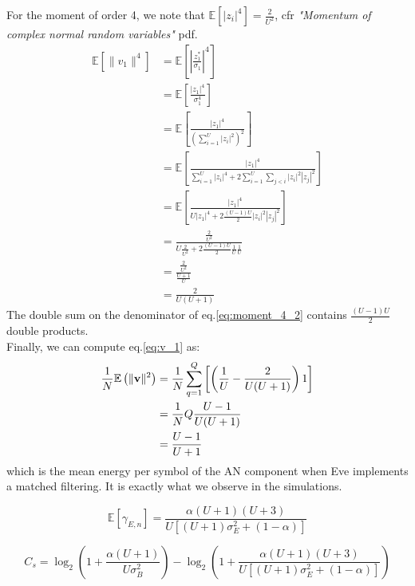 \documentclass[12pt]{article}
\begin{document}
For the moment of order 4, we note that $\mathbb{E}\left[ \left| z_i \right|^4\right] = \frac{2}{U^2}$, cfr \textit{"Momentum of complex normal  random variables"} pdf.
\begin{align}
\mathbb{E} \left[ \| v_1\|^4 \right] &= \mathbb{E}\left[ \left| \frac{z_1^*}{\sigma_1}\right|^4\right] \\
& =  \mathbb{E} \left[ \frac{\left| z_1 \right|^4 }{\sigma_1^4} \right] \\
&=  \mathbb{E} \left[   \frac{\left| z_1 \right|^4 }{  \left( \sum_{i=1}^{U} \left| z_i\right|^2 \right)^2 }  \right] \label{eq:moment_4_1} \\
&= \mathbb{E} \left[   \frac{\left| z_1 \right|^4 }{  \sum_{i=1}^{U} \left| z_i\right|^4 + 2 \sum_{i=1}^{U} \sum_{j<i} \left|z_i\right|^2 \left|z_j\right|^2 }  \right] \label{eq:moment_4_2}\\
&= \mathbb{E} \left[   \frac{\left| z_1 \right|^4 }{ U \left| z_1\right|^4 + 2 \frac{(U-1)U}{2} \left|z_i\right|^2 \left|z_j\right|^2 }  \right] \\
& = \frac{\frac{2}{U^2}}{U\frac{2}{U^2} + 2 \frac{(U-1)U}{2} \frac{1}{U} \frac{1}{U}} \\
& =  \frac{\frac{2}{U^2}}{\frac{U+1}{U}} \\
&= \frac{2}{U(U+1)}
\end{align}
The double sum on the denominator of eq.\ref{eq:moment_4_2} contains $\frac{(U-1)U}{2}$ double products.\\

Finally, we can compute eq.\ref{eq:v_1} as:
\begin{align}
\frac{1}{N}\mathbb{E}\left(\|\boldsymbol{\mathrm{v}}\|^2\right)&=\frac{1}{N} \sum_{q=1}^{Q} \left[ \left( \frac{1}{U} - \frac{2}{U(U+1)} \right) 1\right] \\
&= \frac{1}{N} Q \frac{U-1}{U(U+1)} \\
&= \frac{U-1}{U+1}
\end{align}
which is the mean energy per symbol of the AN component when Eve implements a matched filtering. It is exactly what we observe in the simulations.

\begin{equation}
	\mathbb{E} \left[  \gamma_{E,n}  \right] = \frac{\alpha(U+1)(U+3)}{U\left[ (U+1)\sigma^2_E + (1-\alpha)\right]}
\end{equation}


\begin{equation}
C_s = \log_2\left( 1 + \frac{\alpha (U+1)}{U \sigma^2_B}\right) - \log_2\left(1+\frac{\alpha(U+1)(U+3)}{U\left[ (U+1)\sigma^2_E + (1-\alpha)\right]}\right)
\end{equation}
\end{document}
